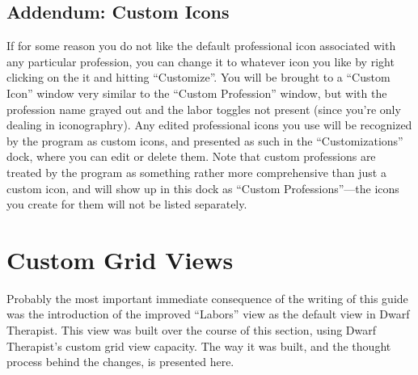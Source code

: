 \documentclass[]{article}
\newcommand{\legacy}[1] {
\begin{center}
\colorbox{legacy-content}{
\begin{minipage}[t]{0.95\linewidth}
#1
\end{minipage}
}
\end{center}
}
\newcommand{\addendum}[1] {
\begin{center}
\colorbox{addendum-content}{
\begin{minipage}[t]{0.96\linewidth}
#1
\end{minipage}
}
\end{center}
}
\begin{document}
\addendum{

\section{Addendum: Custom Icons}
\label{sec:Custom Icons}

If for some reason you do not like the default professional icon associated with any particular
profession, you can change it to whatever icon you like by right clicking on the it and hitting
``Customize''. You will be brought to a ``Custom Icon'' window very similar to the ``Custom Profession''
window, but with the profession name grayed out and the labor toggles not present (since you're only
dealing in iconographry). Any edited professional icons you use will be recognized by the program as
custom icons, and presented as such in the ``Customizations'' dock, where you can edit or delete them.
Note that custom professions are treated by the program as something rather more comprehensive than just
a custom icon, and will show up in this dock as ``Custom Professions''---the icons you create for them
will not be listed separately.

}

\newpage
\section{Custom Grid Views}
\label{sec:Custom Grid Views}

\legacy{
Probably the most important immediate consequence of the writing of this guide was the introduction of
the improved ``Labors'' view as the default view in Dwarf Therapist. This view was built over the
course of this section, using Dwarf Therapist's custom grid view capacity. The way it was built, and the
thought process behind the changes, is presented here.
}
\end{document}
